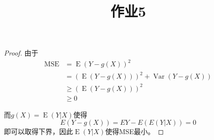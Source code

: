 \documentclass[cn]{homework}
\title{作业5}
\DeclareMathOperator{\var}{Var}
\DeclareMathOperator{\E}{E}
\begin{document}
    \maketitle

    \problem
    \begin{proof}
        由于
        \[\begin{aligned}
            \mathrm{MSE}&=\E(Y-g(X))^2\\
            &=(\E(Y-g(X)))^2+\var(Y-g(X))\\
            &\geq (\E(Y-g(X)))^2\\
            &\geq 0
        \end{aligned}\]

        而$g(X)=\E(Y|X)$使得
        \[E(Y-g(X))=EY-E(E(Y|X))=0\]
        即可以取得下界，因此$\E(Y|X)$使得MSE最小。
    \end{proof}
\end{document}
